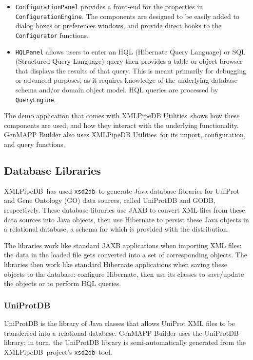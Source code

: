 \documentclass[10pt]{bmc_article}
\newenvironment{bmcformat}{\begin{raggedright}\baselineskip20pt\sloppy\setboolean{publ}{false}}{\end{raggedright}\baselineskip20pt\sloppy}
\def\xmlpipedb{XMLPipeDB}                       %
\def\xsd2db{\texttt{xsd2db}}
\def\xpdutils{XMLPipeDB Utilities}
\begin{document}
\begin{bmcformat}
\begin{itemize}
\item \texttt{ConfigurationPanel} provides a front-end for the properties in \texttt{ConfigurationEngine}.  The components are designed to be easily added to dialog boxes or preferences windows, and provide direct hooks to the \texttt{Configurator} functions.

\item \texttt{HQLPanel} allows users to enter an HQL (Hibernate Query Language) or SQL (Structured Query Language) query then provides a table or object browser that displays the results of that query.  This is meant primarily for debugging or advanced purposes, as it requires knowledge of the underlying database schema and/or domain object model.  HQL queries are processed by \texttt{QueryEngine}.
\end{itemize}
The demo application that comes with \xpdutils\ shows how these components are used, and how they interact with the underlying functionality.  GenMAPP Builder also uses \xpdutils\ for its import, configuration, and query functions.\pb

\subsection*{Database Libraries}

\xmlpipedb\ has used \xsd2db\ to generate Java database libraries for UniProt and Gene Ontology (GO) data sources, called UniProtDB and GODB, respectively.  These database libraries use JAXB to convert XML files from these data sources into Java objects, then use Hibernate to persist these Java objects in a relational database, a schema for which is provided with the distribution.\pb

The libraries work like standard JAXB applications when importing XML files: the data in the loaded file gets converted into a set of corresponding objects.  The libraries then work like standard Hibernate applications when saving these objects to the database: configure Hibernate, then use its classes to save/update the objects or to perform HQL queries.\pb

\subsubsection*{UniProtDB}

UniProtDB is the library of Java classes that allows UniProt XML files to be transferred into a relational database.  GenMAPP Builder uses the UniProtDB library; in turn, the UniProtDB library is semi-automatically generated from the \xmlpipedb\ project's \xsd2db\ tool.\pb


\end{bmcformat}
\end{document}
